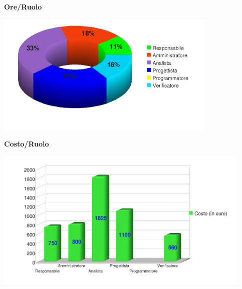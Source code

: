 \newpage
\begin{center}\textbf{Ore/Ruolo}
\end{center}
\includegraphics[width=300pt]{RR-RPP_Ore}

\begin{center}\textbf{Costo/Ruolo}
\end{center}
\includegraphics[width=350pt]{RR-RPP_Costi}



